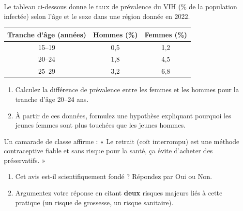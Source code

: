 \documentclass[11pt]{article}
\begin{document}
\begin{exercice}
Le tableau ci-dessous donne le taux de prévalence du VIH (\% de la population infectée) selon l'âge et le sexe dans une région donnée en 2022.

\begin{tabular}{|c|c|c|}
\hline
\textbf{Tranche d'âge (années)} & \textbf{Hommes (\%)} & \textbf{Femmes (\%)} \\
\hline
15--19 & 0,5 & 1,2 \\
20--24 & 1,8 & 4,5 \\
25--29 & 3,2 & 6,8 \\
\hline
\end{tabular}

\begin{enumerate}
    \item Calculez la différence de prévalence entre les femmes et les hommes pour la tranche d'âge 20--24 ans.
    \item À partir de ces données, formulez une hypothèse expliquant pourquoi les jeunes femmes sont plus touchées que les jeunes hommes.
\end{enumerate}
\end{exercice}

\begin{exercice}
Un camarade de classe affirme : « Le retrait (coït interrompu) est une méthode contraceptive fiable et sans risque pour la santé, ça évite d'acheter des préservatifs. »
\begin{enumerate}
    \item Cet avis est-il scientifiquement fondé ? Répondez par Oui ou Non.
    \item Argumentez votre réponse en citant \textbf{deux} risques majeurs liés à cette pratique (un risque de grossesse, un risque sanitaire).
\end{enumerate}
\end{exercice}
\end{document}

